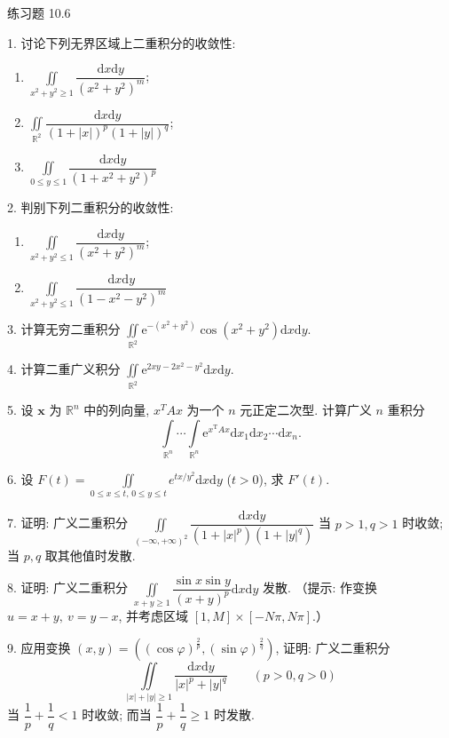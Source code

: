 \begin{exblock}{练习题 10.6}

1. 讨论下列无界区域上二重积分的收敛性:
\begin{enumerate}
\item[(1)] $\iint\limits_{x^{2}+y^{2} \geqslant 1} \dfrac{\mathrm{d}x\mathrm{d}y}{(x^{2}+y^{2})^{m}}$;
\item[(2)] $\iint\limits_{\mathbb{R}^{2}} \dfrac{\mathrm{d}x\mathrm{d}y}{(1+|x|)^{p}(1+|y|)^{q}}$;
\item[(3)] $\iint\limits_{0 \leqslant y \leqslant 1} \dfrac{\mathrm{d}x\mathrm{d}y}{(1+x^{2}+y^{2})^{p}}$
\end{enumerate}

2. 判别下列二重积分的收敛性:
\begin{enumerate}
\item[(1)] $\iint\limits_{x^{2}+y^{2} \leqslant 1} \dfrac{\mathrm{d}x\mathrm{d}y}{(x^{2}+y^{2})^{m}}$;
\item[(2)] $\iint\limits_{x^{2}+y^{2} \leqslant 1} \dfrac{\mathrm{d}x\mathrm{d}y}{(1-x^{2}-y^{2})^{m}}$
\end{enumerate}

3. 计算无穷二重积分
$\iint\limits_{\mathbb{R}^{2}} \mathrm{e}^{-(x^{2}+y^{2})} \cos(x^{2}+y^{2}) \mathrm{d}x\mathrm{d}y$.

4. 计算二重广义积分
$\iint\limits_{\mathbb{R}^{2}} \mathrm{e}^{2xy-2x^{2}-y^{2}} \mathrm{d}x\mathrm{d}y$.

5. 设 $\boldsymbol{x}$ 为 $\mathbb{R}^{n}$ 中的列向量, $x^{T}Ax$ 为一个 $n$ 元正定二次型.
计算广义 $n$ 重积分
\[
\int\limits_{\mathbb{R}^{n}} \cdots \int\limits_{\mathbb{R}^{n}}
 \mathrm{e}^{x^{\mathrm{T}}Ax} \mathrm{d}x_{1} \mathrm{d}x_{2} \cdots \mathrm{d}x_{n}.
\]

6. 设 $F(t) = \iint\limits_{0 \leqslant x \leqslant t,\, 0 \leqslant y \leqslant t}
e^{t x / y^{2}} \mathrm{d}x \mathrm{d}y$ ($t > 0$), 求 $F'(t)$.

7. 证明: 广义二重积分
$\iint\limits_{(-\infty,+\infty)^{2}} \dfrac{\mathrm{d}x\mathrm{d}y}{(1+|x|^{p})(1+|y|^{q})}$
当 $p > 1, q > 1$ 时收敛; 当 $p, q$ 取其他值时发散.

8. 证明: 广义二重积分
$\iint\limits_{x+y \geqslant 1} \dfrac{\sin x \sin y}{(x+y)^{p}} \mathrm{d}x\mathrm{d}y$ 发散.
（提示: 作变换 $u = x+y,\ v = y-x$, 并考虑区域 $[1,M] \times [-N\pi, N\pi]$.）

9. 应用变换 $(x, y) = \left( (\cos\varphi)^{\frac{2}{p}}, (\sin\varphi)^{\frac{2}{q}} \right)$,
证明: 广义二重积分
\[
\iint\limits_{|x|+|y| \geqslant 1} \frac{\mathrm{d}x\mathrm{d}y}{|x|^{p}+|y|^{q}}
\qquad (p > 0, q > 0)
\]
当 $\dfrac{1}{p} + \dfrac{1}{q} < 1$ 时收敛; 而当
$\dfrac{1}{p} + \dfrac{1}{q} \geqslant 1$ 时发散.


\end{exblock}
